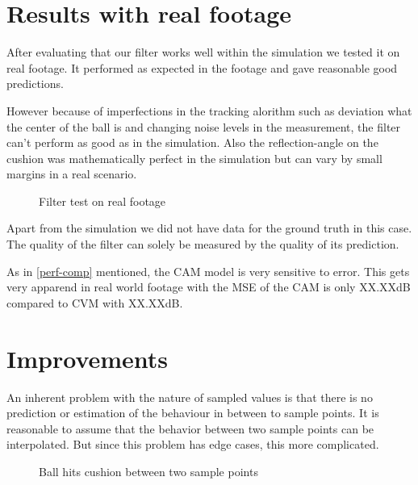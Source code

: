 \documentclass[notitlepage, a4paper, 11pt]{scrartcl}
\begin{document}
\begin{multicols}{2}
\section{Results with real footage}

After evaluating that our filter works well within the simulation we tested it on real footage. 
It performed as expected in the footage and gave reasonable good predictions.

However because of imperfections in the tracking alorithm such as deviation what the center of the ball is and changing noise levels in the measurement, 
the filter can't perform as good as in the simulation. Also the reflection-angle on the cushion was mathematically perfect in the simulation
but can vary by small margins in a real scenario.

\begin{figure}[H]
    \centering
    \caption{Filter test on real footage}
    \label{fig:realfootage}
\end{figure}

Apart from the simulation we did not have data for the ground truth in this case. 
The quality of the filter can solely be measured by the quality of its prediction. 

As in \cref{perf-comp} mentioned, the CAM model is very sensitive to error. This gets very apparend in real world footage with the MSE of the CAM is only XX.XXdB compared to CVM with XX.XXdB.

\section{Improvements}

An inherent problem with the nature of sampled values is that there is no prediction or estimation
of the behaviour in between to sample points. It is reasonable to assume that the behavior between
two sample points can be interpolated. But since this problem has edge cases, this more complicated.

\begin{figure}[H]
    \centering
    \caption{Ball hits cushion between two sample points}
    \label{fig:edge-case}
\end{figure}


\end{multicols}
\end{document}
